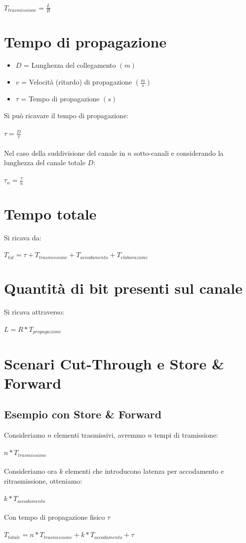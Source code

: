 \documentclass[a4paper]{report}
\begin{document}
	{$T_{\textit{trasmissione}} = \frac{L}{R}$
	\section{Tempo di propagazione}
	\begin{itemize}
		\item $D$ = Lunghezza del collegamento $(m)$
		\item $v$ = Velocità (ritardo) di propagazione $(\frac{m}{s})$
		\item $\tau$ = Tempo di propagazione $(s)$
	\end{itemize}
	Si può ricavare il tempo di propagazione:\\\\
	$\tau = \frac{D}{v}$\\\\
	Nel caso della suddivisione del canale in $n$ sotto-canali e considerando la lunghezza del canale totale $D$:\\\\ 
	$\tau_{n} = \frac{\tau}{n}$
	\section{Tempo totale}
	Si ricava da:\\\\
	$T_{\textit{tot}} = \tau + T_{\textit{trasmissione}} + T_{\textit{accodamento}} + T_{\textit{elaborazione}}$
	\section{Quantità di bit presenti sul canale}
	Si ricava attraverso:\\\\
	$L = R * T_{\textit{propagazione}}$
	\section{Scenari Cut-Through e Store \& Forward}
	\subsection{Esempio con Store \& Forward}
	Consideriamo $n$ elementi trasmissivi, avremmo $n$ tempi di tramissione: \\\\ 
	$n * T_{trasmissione}$ \\\\
	Consideriamo ora $k$ elementi che introducono latenza per accodamento e ritrasmissione, otteniamo: \\\\
	$k * T_{accodamento}$\\\\
	Con tempo di propagazione fisico $\tau$ \\\\
	$T_{totale} = n * T_{trasmissione} + k * T_{accodamento} + \tau$
}
\end{document}
